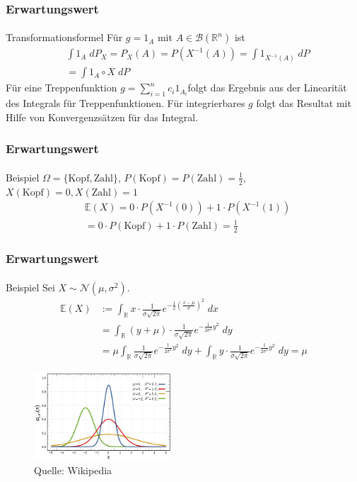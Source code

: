 \documentclass{beamer}
\begin{document}
\begin{frame}
    \frametitle{Erwartungswert}
\framesubtitle{}
\begin{block}{Transformationsformel}
Für $g = 1_A$ mit $A \in \mathcal{B}(\mathbb{R}^n)$ ist
\begin{align*}
& \int 1_A \; dP_X = P_X(A) = P(X^{-1} (A)) = \int 1_{X^{-1}(A)} \; dP \\
&= \int 1_{A} \circ X \; dP
\end{align*}
Für eine Treppenfunktion $g= \sum_{i= 1}^n c_i 1_{A_i} $folgt das Ergebnis aus der Linearität des Integrals  für Treppenfunktionen. Für integrierbares $g$ folgt das Resultat mit Hilfe von Konvergenzsätzen für das  Integral.
\end{block}
 \end{frame}

\begin{frame}
    \frametitle{Erwartungswert}
\framesubtitle{}
\begin{block}{Beispiel}
$\Omega = \{ \text{Kopf},\text{Zahl}\}$, $P(\text{Kopf}) = P(\text{Zahl}) = \frac{1}{2}$, $X(\text{Kopf}) = 0,  X(\text{Zahl}) = 1$ 
\begin{align*}
& \mathbb{E}(X)  = 0 \cdot P(X^{-1}(0) ) + 1 \cdot P(X^{-1}(1)) \\
& =0  \cdot P(\text{Kopf}) + 1 \cdot P(\text{Zahl}) = \frac{1}{2}  
\end{align*}
\end{block}
 \end{frame}



\begin{frame}
    \frametitle{Erwartungswert}
\framesubtitle{}
\begin{block}{Beispiel}
Sei $X \sim \mathcal{N}(\mu, \sigma^2)$.
\begin{align*}
\mathbb{E}(X) & := \int_{\mathbb{R}}  x \cdot  \frac 1{\sigma \sqrt{2\pi}}e^{- \frac {1}{2 } (\frac{x- \mu}{ \sigma})^2} \; dx  \\
&= \int_{\mathbb{R}}  (y + \mu) \cdot  \frac 1{\sigma \sqrt{2\pi}}e^{- \frac {1}{2 \sigma^2} y^2} \; dy \\
 &  = \mu  \int_{\mathbb{R}}      \frac 1{\sigma \sqrt{2\pi}}e^{- \frac {1}{2 \sigma^2} y^2} \; dy  + \int_{\mathbb{R}}  y  \cdot  \frac 1{\sigma \sqrt{2\pi}}e^{- \frac {1}{2 \sigma^2} y^2} \; dy = \mu
\end{align*}
\end{block}
\begin{figure}[htp]
      \centering
    \includegraphics[width=0.46\textwidth]{img/normal}
      \caption{Quelle: Wikipedia}
\end{figure}
 \end{frame}
\end{document}
